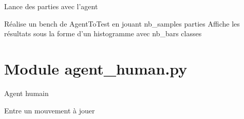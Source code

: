 \documentclass[letterpaper,10pt,french]{sphinxmanual}
\begin{document}

\begin{fulllineitems}
\label{\detokenize{index:agent.playGame}}
Lance des parties avec l’agent

\end{fulllineitems}


\begin{fulllineitems}
\label{\detokenize{index:agent.plotBenchPlayer}}
Réalise un bench de AgentToTest en jouant nb\_samples parties
Affiche les résultats sous la forme d’un histogramme avec nb\_bars classes

\end{fulllineitems}


\begin{fulllineitems}
\label{\detokenize{index:agent.random}}\pysiglinewithargsret{\sphinxcode{agent.}\sphinxbfcode{random}}{}{{ $\rightarrow$ x in the interval {[}0, 1).}}
\end{fulllineitems}



\section{Module agent\_human.py}
\label{\detokenize{index:module-agent_human}}\label{\detokenize{index:module-agent-human-py}}

\begin{fulllineitems}
\label{\detokenize{index:agent_human.AgentHuman}}
Agent humain

\begin{fulllineitems}
\label{\detokenize{index:agent_human.AgentHuman.getMove}}
Entre un mouvement à jouer

\end{fulllineitems}


\end{fulllineitems}
\end{document}
